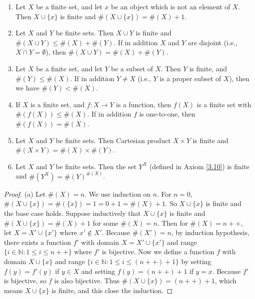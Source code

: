 \begin{proposition}\label{3.6.14}
\leavevmode
\begin{enumerate}
    \item Let \(X\) be a finite set, and let \(x\) be an object which is not an element of \(X\).
    Then \(X \cup \{x\}\) is finite and \(\#(X \cup \{x\}) = \#(X) + 1\).
    \item Let \(X\) and \(Y\) be finite sets.
    Then \(X \cup Y\) is finite and \(\#(X \cup Y) \leq \#(X) + \#(Y)\).
    If in addition \(X\) and \(Y\) are disjoint (i.e., \(X \cap Y = \emptyset\)), then \(\#(X \cup Y) = \#(X) + \#(Y)\).
    \item Let \(X\) be a finite set, and let \(Y\) be a subset of \(X\).
    Then \(Y\) is finite, and \(\#(Y) \leq \#(X)\).
    If in addition \(Y \neq X\) (i.e., \(Y\) is a proper subset of \(X\)), then we have \(\#(Y) < \#(X)\).
    \item If \(X\) is a finite set, and \(f : X \to Y\) is a function, then \(f(X)\) is a finite set with \(\#(f(X)) \leq \#(X)\).
    If in addition \(f\) is one-to-one, then \(\#(f(X)) = \#(X)\).
    \item Let \(X\) and \(Y\) be finite sets.
    Then Cartesian product \(X \times Y\) is finite and \(\#(X \times Y) = \#(X) \times \#(Y)\).
    \item Let \(X\) and \(Y\) be finite sets.
    Then the set \(Y^X\) (defined in Axiom \ref{3.10}) is finite and \(\#(Y^X) = \#(Y)^{\#(X)}\).
\end{enumerate}
\end{proposition}

\begin{proof}{(a)}
Let \(\#(X) = n\).
We use induction on \(n\).
For \(n = 0\), \(\#(X \cup \{x\}) = \#(\{x\}) = 1 = 0 + 1 = \#(X) + 1\).
So \(X \cup \{x\}\) is finite and the base case holds.
Suppose inductively that \(X \cup \{x\}\) is finite and \(\#(X \cup \{x\}) = \#(X) + 1\) for some \(\#(X) = n\).
Then for \(\#(X) = n++\), let \(X = X' \cup \{x'\}\) where \(x' \notin X'\).
Because \(\#(X') = n\), by induction hypothesis, there exists a function \(f'\) with domain \(X = X' \cup \{x'\}\) and range \(\{i \in \mathds{N} : 1 \leq i \leq n++\}\) where \(f'\) is bijective.
Now we define a function \(f\) with domain \(X \cup \{x\}\) and range \(\{i \in \mathds{N} : 1 \leq i \leq (n++) + 1\}\) by setting \(f(y) = f'(y)\) if \(y \in X\) and setting \(f(y) = (n++) + 1\) if \(y = x\).
Because \(f'\) is bijective, so \(f\) is also bijective.
Thus \(\#(X \cup \{x\}) = (n++) + 1\), which means \(X \cup \{x\}\) is finite, and this close the induction.
\end{proof}

